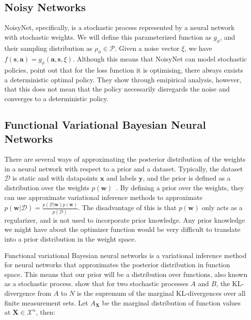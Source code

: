 \documentclass[]{uai2021} %
\newcommand{\D}{\mathcal{D}}
\newcommand{\X}{\mathbf{X}}
\begin{document}

\subsection{Noisy Networks}
NoisyNet, specifically, is a stochastic
process represented by a neural network with stochastic weights. We will define
this parameterized function as \(g_\phi\), and their sampling distribution as
\(\rho_\phi \in \mathcal{P}\). Given a noise vector \(\xi\), we have
\(f(\bm{s}, \bm{a}) = g_\phi(\bm{a}, \bm{s}, \xi)\). Although this means
that NoisyNet can model stochastic policies, \citet{fortunato_noisy_2019} point
out that for the loss function it is optimising, there always exsists a deterministic
optimal policy. They show through emipirical analysis, however, that this does not
mean that the policy necessarily disregards the noise and converges to a deterministic
policy.

\subsection{Functional Variational Bayesian Neural Networks}
There are several ways of approximating the posterior distribution of the weights
in a neural network with respect to a prior and a dataset. Typically, the dataset
\(\D\) is static and with datapoints \(\bm{x}\) and labels \(\bm{y}\), and the 
prior is defined as a distribution over the weights
\(p(\bm{w})\)~\citep{rezende_stochastic_2014,blundell_weight_2015,ritter_scalable_2018,maddox_simple_2019}.
By defining a prior over the weights, they can use approximate variational inference
methods to approximate \(p(\bm{w} \vert \D) = \frac{p(\D \vert \bm{w})p(\bm{w})}{p(\D)}\).
The disadvantage of this is that \(p(\bm{w})\) only acts as a regularizer, and is not
used to incorporate prior knowledge. Any prior knowledge we might have about the optimizer
function would be very difficult to translate into a prior distribution in the weight space.

Functional variational Bayesian neural networks \citep{sun_functional_2019} is 
a variational inference method for neural networks that approximates the 
posterior distribution in function space. This means that our prior will be a distribution
over functions, also known as a stochastic process.
\citet{sun_functional_2019} show that for two stochastic processes \(A\) and \(B\), the
KL-divergence from \(A\) to \(N\) is the supremum of the marginal KL-divergences over
all finite measurement sets. Let \(A_\X\) be the marginal distribution of function values
at \(\X \in \mathcal{X}^n\), then:
\end{document}
